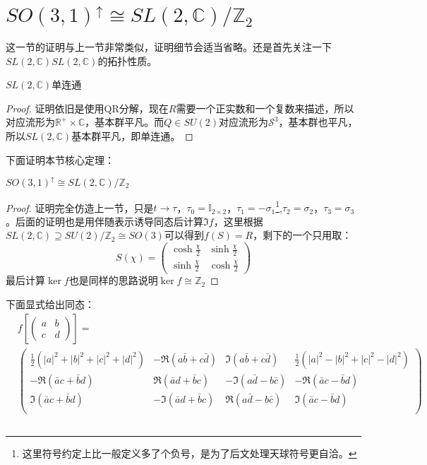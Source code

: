 \section{$SO(3,1)^\uparrow\cong SL(2,\mathbb{C})/\mathbb{Z}_2$}
这一节的证明与上一节非常类似，证明细节会适当省略。还是首先关注一下$SL(2,\mathbb{C})$$SL(2,\mathbb{C})$的拓扑性质。
\begin{lemma}
	$SL(2,\mathbb{C})$单连通
\end{lemma}
\begin{proof}
	证明依旧是使用QR分解，现在$R$需要一个正实数和一个复数来描述，所以对应流形为$\mathbb{R}^+\times\mathbb{C}$，基本群平凡。而$Q\in SU(2)$对应流形为$\mathcal{S}^3$，基本群也平凡，所以$SL(2,\mathbb{C})$基本群平凡，即单连通。
\end{proof}
下面证明本节核心定理：
\begin{theorem}
	$SO(3,1)^\uparrow\cong SL(2,\mathbb{C})/\mathbb{Z}_2$
\end{theorem}
\begin{proof}
	证明完全仿造上一节，只是$t\to\tau$，$\tau_0=\mathbb{I}_{2\times 2}$，$\tau_1=-\sigma_1$\footnote{这里符号约定上比一般定义多了个负号，是为了后文处理天球符号更自洽。},$\tau_2=\sigma_2$，$\tau_3=\sigma_3$。后面的证明也是用伴随表示诱导同态后计算$\Im f$，这里根据$SL(2,\mathbb{C})\supseteq SU(2)/\mathbb{Z}_2\cong SO(3)$可以得到$f(S)=R$，剩下的一个只用取：
	\[S(\chi)=\begin{pmatrix}
		\cosh\frac{\chi}{2} &\sinh\frac{\chi}{2} \\
		\sinh\frac{\chi}{2} &\cosh\frac{\chi}{2} 
	\end{pmatrix}\]
	最后计算$\ker f$也是同样的思路说明$\ker f\cong\mathbb{Z}_2$
\end{proof}
\begin{remark}
	下面显式给出同态：
	\begin{equation}\label{eq:8.1}
		\begin{aligned}
		&f\left[\begin{pmatrix}
			a &b \\
			c&d
		\end{pmatrix}\right]=\\
		&\begin{pmatrix}
			\frac{1}{2}\left(|a|^2+|b|^2+|c|^2+|d|^2\right) &-\Re(a\bar b +c\bar d) &\Im(a\bar b +c\bar d)&\frac{1}{2}\left(|a|^2-|b|^2+|c|^2-|d|^2\right)\\
			-\Re(\bar ac +\bar bd)&\Re(\bar ad +\bar bc)&-\Im(a\bar d- b\bar c)&-\Re(\bar ac -\bar bd)\\
			\Im(\bar ac +\bar bd)&-\Im(\bar ad +\bar bc)&\Re(a\bar d- b\bar c)&\Im(\bar ac -\bar bd)\\

\end{pmatrix}
\end{aligned}
\end{equation}
\end{remark}$$
